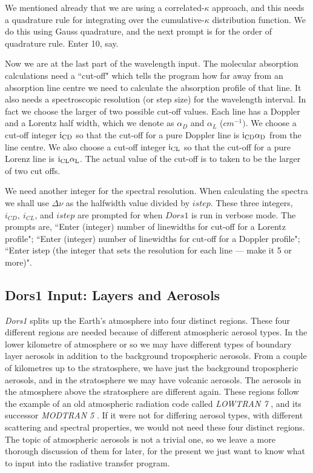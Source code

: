 \documentclass[12pt]{article}
\begin{document}
We mentioned already that we are using a correlated-$\kappa$ approach, and this needs a quadrature rule
for integrating over the cumulative-$\kappa$ distribution function. We do this using Gauss quadrature, and the
next prompt is for the order of quadrature rule. Enter 10, say.

Now we are at the last part of the wavelength input. 
The molecular absorption calculations need a ``cut-off" which tells
the program how far away from an absorption line centre we need to calculate the absorption profile
of that line. It also needs a spectroscopic resolution (or step size) for the wavelength interval.
In fact we choose the larger of two possible cut-off values. Each line has a Doppler and a Lorentz
 half width, which we denote as $\alpha_D$ and $\alpha_L$ ($cm^{-1})$. 
We choose a cut-off integer $\rm{i}_{CD}$ so that the cut-off for a pure Doppler line is $ \rm{i}_{CD} \alpha_D$
from the line centre.
We also choose a cut-off integer $\rm{ i}_{CL}$ so that the cut-off for a pure Lorenz line is 
$ \rm{i}_{CL} \alpha_L$. The actual value of the cut-off is to taken to be the larger of two
cut offs. 

We need another integer for the spectral resolution. When calculating the spectra
we shall use $\Delta \nu$ as the halfwidth value divided by $istep$. These three integers, $i_{CD}, \> i_{CL}$,
 and $istep$ 
 are prompted for when $Dors1$ is run in verbose mode. The prompts are,
``Enter (integer) number of linewidths for cut-off for a Lorentz profile"; ``Enter (integer) number of linewidths for cut-off for a Doppler profile"; ``Enter istep (the integer that sets the resolution for each line --- make it 5 or more)".



\subsection{Dors1 Input: Layers and Aerosols}

{\it Dors1} splits up the Earth's atmosphere into four distinct regions.
These four different regions are needed because of
 different  atmospheric aerosol types. In the lower
kilometre of atmosphere or so we may have different types of boundary layer
aerosols in addition to the background tropospheric aerosols. From a couple of kilometres
up to the stratosphere, we have  just the background tropospheric aerosols, and in the stratosphere we may have
volcanic aerosols. The aerosols in the atmosphere above the stratosphere are different again.
These regions follow the example of an old atmospheric radiation code called {\it LOWTRAN 7}
\cite{LOWTRAN:Mybib}, and  its successor {\it MODTRAN 5} \cite{MODTRAN:Mybib}.
If it were not for differing aerosol types, with different scattering and spectral properties,
we would not need these four distinct regions. The topic of atmospheric aerosols is not a trivial
one, so we leave a more thorough discussion of them for later, for the present we just
want to know what to input into the radiative transfer program.
\end{document}
